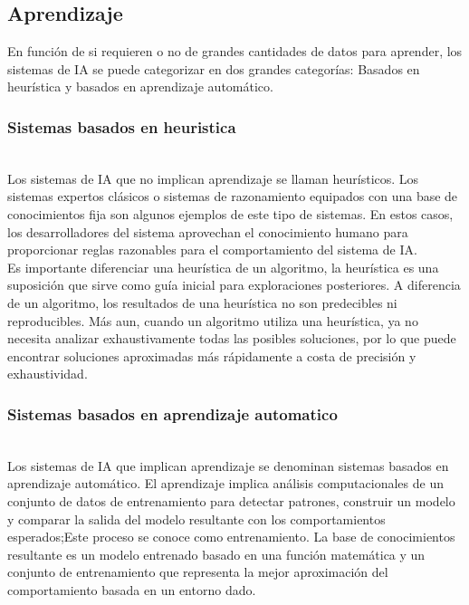 \subsection{Aprendizaje}
En función de si requieren o no de grandes cantidades de datos para aprender, los sistemas de IA se puede categorizar en dos grandes categorías: Basados en heurística y basados en aprendizaje automático. 

\subsubsection{Sistemas basados en heuristica}\hfill\\ 
\indent
Los sistemas de IA que no implican aprendizaje se llaman heurísticos. Los sistemas expertos clásicos o sistemas de razonamiento equipados con una base de conocimientos fija son algunos ejemplos de este tipo de sistemas. En estos casos, los desarrolladores del sistema aprovechan el conocimiento humano para proporcionar reglas razonables para el comportamiento del sistema de IA.\\ 
\indent
Es importante diferenciar una heurística de un algoritmo, la heurística es una suposición que sirve como guía inicial para exploraciones posteriores. A diferencia de un algoritmo, los resultados de una heurística no son predecibles ni reproducibles. Más aun, cuando un algoritmo utiliza una heurística, ya no necesita analizar exhaustivamente todas las posibles soluciones, por lo que puede encontrar soluciones aproximadas más rápidamente a costa de precisión y exhaustividad.

\subsubsection{Sistemas basados en aprendizaje automatico}\hfill\\ 
\indent
Los sistemas de IA que implican aprendizaje se denominan sistemas basados en aprendizaje automático. El aprendizaje implica análisis computacionales de un conjunto de datos de entrenamiento para detectar patrones, construir un modelo y comparar la salida del modelo resultante con los comportamientos esperados;Este proceso se conoce como entrenamiento. La base de conocimientos resultante es un modelo entrenado basado en una función matemática y un conjunto de entrenamiento que representa la mejor aproximación del comportamiento basada en un entorno dado.

